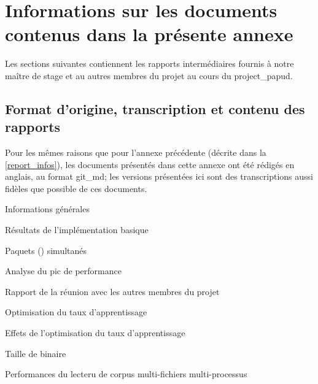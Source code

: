 \section{Informations sur les documents contenus dans la présente annexe}
Les sections suivantes contiennent les rapports intermédiaires fournis à notre maître de stage et au autres membres du projet au cours du \gls{project_papud}.

\subsection{Format d'origine, transcription et contenu des rapports}
Pour les mêmes raisons que pour l'annexe précédente (décrite dans la \autoref{report_infos}), les documents présentés dans cette annexe ont été rédigés en anglais, au format \gls{git_md}; les versions présentées ici sont des transcriptions aussi fidèles que possible de ces documents.

\newpage
\begin{report}{Informations générales}
	
\end{report}
\begin{report}{Résultats de l'implémentation basique}
	
\end{report}
\begin{report}{Paquets () simultanés}

\end{report}
\begin{report}{Analyse du pic de performance}

\end{report}
\begin{report}{Rapport de la réunion avec les autres membres du projet}

\end{report}
\begin{report}{Optimisation du taux d'apprentissage}

\end{report}
\begin{report}{Effets de l'optimisation du taux d'apprentissage}

\end{report}
\begin{report}{Taille de  binaire}

\end{report}
\begin{report}{Performances du lecteru de corpus multi-fichiers multi-processus}

\end{report}
